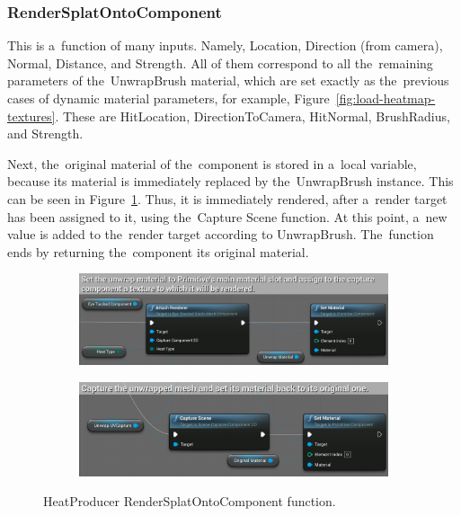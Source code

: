 \subsubsection*{RenderSplatOntoComponent}

This is a~function of many inputs. Namely, Location, Direction (from camera), Normal, Distance, and Strength. All of them correspond to all the~remaining parameters of the~UnwrapBrush material, which are set exactly as the~previous cases of dynamic material parameters, for example, Figure~\ref{fig:load-heatmap-textures}. These are HitLocation, DirectionToCamera, HitNormal, BrushRadius, and Strength.

Next, the~original material of the~component is stored in a~local variable, because its material is immediately replaced by the~UnwrapBrush instance. This can be seen in Figure~\ref{fig:render-splat-function}. Thus, it is immediately rendered, after a~render target has been assigned to it, using the~Capture Scene function. At this point, a~new value is added to the~render target according to UnwrapBrush. The~function ends by returning the~component its original material. 

\begin{figure}[!ht]\centering
    \begin{subfigure}[b]{\textwidth}
        \centering
        \includegraphics[width=\textwidth]{img/render-splat-1.png}
    \end{subfigure}
    \hfill
    \begin{subfigure}[b]{\textwidth}
        \centering
        \includegraphics[width=\textwidth]{img/render-splat-2.png}
    \end{subfigure}
    \caption{HeatProducer RenderSplatOntoComponent function.}
    \label{fig:render-splat-function}
\end{figure}

